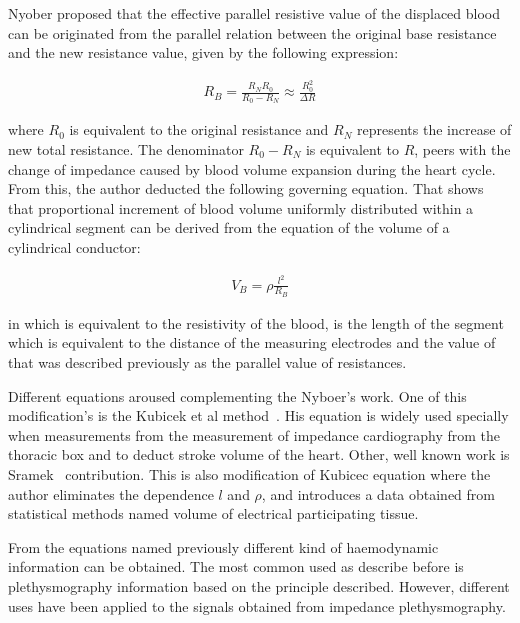 Nyober proposed that the effective parallel resistive value of the displaced blood can be originated from the parallel relation between the original base resistance and the new resistance value, given by the following expression:

\begin{align}
R_B=\frac{R_N R_0}{R_0-R_N} \approx \frac{R^2_0}{\Delta R}
\end{align}

where $R_0$ is equivalent to the original resistance and $R_N$ represents the increase of new total resistance. The denominator $R_0 - R_N$ is equivalent to $R$, peers with the change of impedance caused by blood volume expansion during the heart cycle. From this, the author deducted the following governing equation. That shows that proportional increment of blood volume uniformly distributed within a cylindrical segment can be derived from the equation of the volume of a cylindrical conductor:

\begin{align}
\label{eq:nyober}
V_B = \rho \frac{l^2}{R_B}
\end{align}

in which  is equivalent to the resistivity of the blood, is the length of the segment which is equivalent to the distance of the measuring electrodes and the value of  that was described previously as the parallel value of resistances.

Different equations aroused complementing the Nyboer's work. One of this modification's is the Kubicek et al method~\cite{karnegis1966development}. His equation is widely used specially when measurements from the measurement of impedance cardiography from the thoracic box and to deduct stroke volume of the heart. Other, well known work is Sramek~\cite{sramek1986bomed} contribution. This is also modification of Kubicec equation where the author eliminates the dependence $l$ and $\rho$,  and introduces a data obtained from statistical methods named volume of electrical participating tissue. 

From the equations named previously different kind of haemodynamic information can be obtained. The most common used as describe before is plethysmography information based on the principle described. However, different uses have been applied to the signals obtained from impedance plethysmography. 

